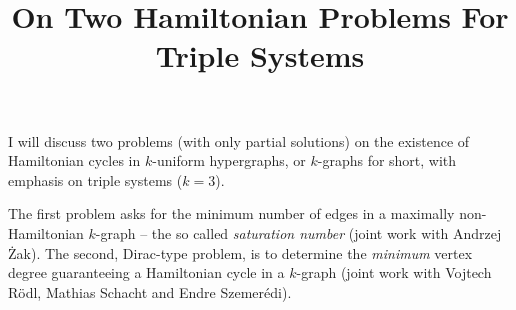 \title{On Two Hamiltonian Problems For Triple Systems}
\endtitle

I will discuss two problems (with only partial solutions) on the existence of Hamiltonian cycles in $k$-uniform hypergraphs, or $k$-graphs for short, with emphasis on  triple systems ($k=3$).

The first problem asks for the minimum number of edges in a ma\-xi\-mally non-Hamiltonian $k$-graph -- the so called \emph{saturation number} (joint work with Andrzej {\.Z}ak). The second, Dirac-type problem, is to determine the  \emph{minimum} vertex degree guaranteeing a Hamiltonian cycle in a $k$-graph (joint work with Vojtech R\"odl, Mathias Schacht and  Endre Szemer\'edi).